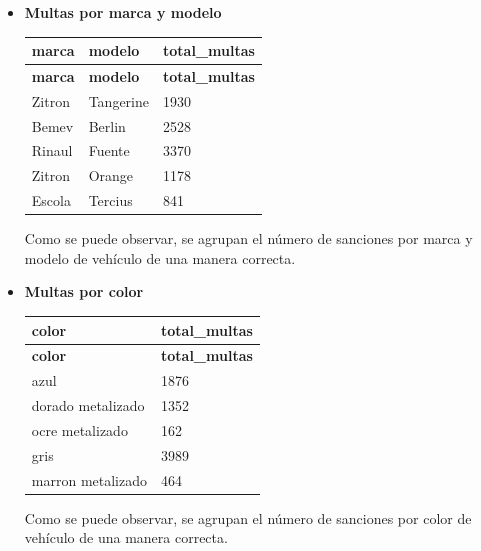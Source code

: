 \documentclass[]{article}
\begin{document}
\begin{itemize}
    \item \textbf{Multas por marca y modelo}

\begin{table}[H]
\begin{longtable}{l l l}
    \hline
    \textbf{marca} & \textbf{modelo} & \textbf{total\_multas} \\ \hline
    \endfirsthead
    
    \hline
    \textbf{marca} & \textbf{modelo} & \textbf{total\_multas} \\ \hline
    \endhead
    
    Zitron & Tangerine & 1930 \\ \hline
    Bemev & Berlin & 2528 \\ \hline
    Rinaul & Fuente & 3370 \\ \hline
    Zitron & Orange & 1178 \\ \hline
    Escola & Tercius & 841 \\ \hline
    
\end{longtable}
\end{table}

Como se puede observar, se agrupan el número de sanciones por marca y modelo de vehículo de una manera correcta.

    \item \textbf{Multas por color}

\begin{table}[H]
\begin{longtable}{l l}
    \hline
    \textbf{color} & \textbf{total\_multas} \\ \hline
    \endfirsthead
    
    \hline
    \textbf{color} & \textbf{total\_multas} \\ \hline
    \endhead
    
    azul & 1876 \\ \hline
    dorado metalizado & 1352 \\ \hline
    ocre metalizado & 162 \\ \hline
    gris & 3989 \\ \hline
    marron metalizado & 464 \\ \hline

\end{longtable}
\end{table}

Como se puede observar, se agrupan el número de sanciones por color de vehículo de una manera correcta.


\end{itemize}
\end{document}
